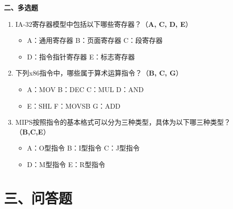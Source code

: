 \documentclass[12pt,a4paper]{article}
\begin{document}
\textbf{二、多选题}

\begin{enumerate}
    \item IA-32寄存器模型中包括以下哪些寄存器？（\textbf{A, C, D, E}）
    \begin{itemize}[label={}, leftmargin=*]
        \item A：通用寄存器 \quad B：页面寄存器 \quad C：段寄存器 \quad 
        \item D：指令指针寄存器 \quad E：标志寄存器
    \end{itemize}

    \item 下列x86指令中，哪些属于算术运算指令？（\textbf{B, C, G}）
    \begin{itemize}[label={}, leftmargin=*]
        \item A：MOV \quad B：DEC \quad C：MUL \quad D：AND \quad 
        \item E：SHL \quad F：MOVSB \quad G：ADD
    \end{itemize}

    \item MIPS按照指令的基本格式可以分为三种类型，具体为以下哪三种类型？（\textbf{B,C,E}）
    \begin{itemize}[label={}, leftmargin=*]
        \item A：O型指令 \quad B：I型指令 \quad C：J型指令 \quad 
        \item D：M型指令 \quad E：R型指令
    \end{itemize}
\end{enumerate}

\section*{三、问答题}
\end{document}
